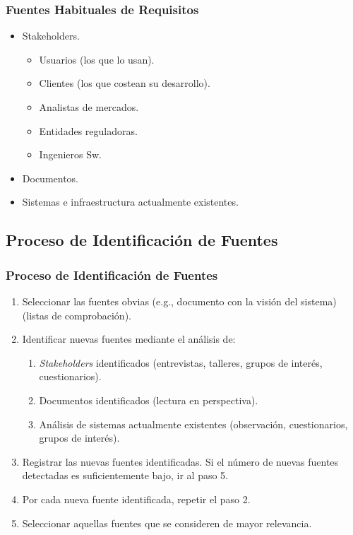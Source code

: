 ﻿\documentclass[handout,a4paper,slidestop,xcolor=pst,dvips,blue]{beamer}
\begin{document}
\begin{frame}[c]
     \frametitle{Fuentes Habituales de Requisitos}
     \begin{itemize}[<+->]
        \item Stakeholders.
            \begin{itemize}[<+->]
                \item Usuarios (los que lo usan).
                \item Clientes (los que costean su desarrollo).
                \item Analistas de mercados.
                \item Entidades reguladoras.
                \item Ingenieros Sw.
            \end{itemize}
        \item Documentos.
        \item Sistemas e infraestructura actualmente existentes.
     \end{itemize}
\end{frame}

\subsection{Proceso de Identificación de Fuentes}

\begin{frame}
     \frametitle{Proceso de Identificación de Fuentes}
     \begin{enumerate}
        \item<1-> Seleccionar las fuentes obvias (e.g., documento con la visión del sistema) (listas de comprobación).
        \item<2-> Identificar nuevas fuentes mediante el análisis de:
            \begin{enumerate}
                \item<3-> \emph{Stakeholders} identificados (entrevistas, talleres, grupos de interés, cuestionarios).
                \item<4-> Documentos identificados (lectura en perspectiva).
                \item<5-> Análisis de sistemas actualmente existentes (observación, cuestionarios, grupos de interés).
            \end{enumerate}
        \item<6-> Registrar las nuevas fuentes identificadas. Si el número de nuevas fuentes detectadas es suficientemente bajo, ir al paso 5.
        \item<7-> Por cada nueva fuente identificada, repetir el paso 2.
        \item<8-> Seleccionar aquellas fuentes que se consideren de mayor relevancia.
     \end{enumerate}
\end{frame}
\end{document}
